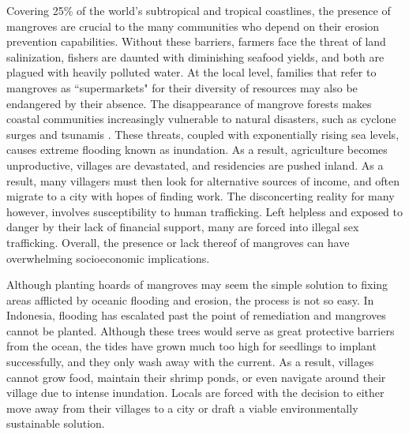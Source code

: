   Covering 25\% of the world's subtropical and tropical coastlines, the presence of mangroves are crucial to the many communities who depend on their erosion prevention capabilities. Without these barriers, farmers face the threat of land salinization, fishers are daunted with diminishing seafood yields, and both are plagued with heavily polluted water.  At the local level, families that refer to mangroves as ``supermarkets" for their diversity of resources may also be endangered by their absence. The disappearance of mangrove forests makes coastal communities increasingly vulnerable to natural disasters, such as cyclone surges and tsunamis \citep{aluri2013reproductive}. These threats, coupled with exponentially rising sea levels, causes  extreme flooding known as inundation. As a result, agriculture becomes unproductive, villages are devastated, and residencies are pushed inland. As a result, many villagers must then look for alternative sources of income, and often migrate to a city with hopes of finding work. The disconcerting reality for many however, involves susceptibility to human trafficking. Left helpless and exposed to danger by their lack of financial support, many are forced into illegal sex trafficking. Overall, the presence or lack thereof of mangroves can have overwhelming socioeconomic implications.

  Although planting hoards of mangroves may seem the simple solution to fixing areas afflicted by oceanic flooding and erosion, the process is not so easy. In Indonesia, flooding has escalated past the point of remediation and mangroves cannot be planted. Although these trees would serve as great protective barriers from the ocean, the tides have grown much too high for seedlings to implant successfully, and they only wash away with the current. As a result, villages cannot grow food, maintain their shrimp ponds, or even navigate around their village due to intense inundation. Locals are forced with the decision to either move away from their villages to a city or draft a viable environmentally sustainable solution.
  
